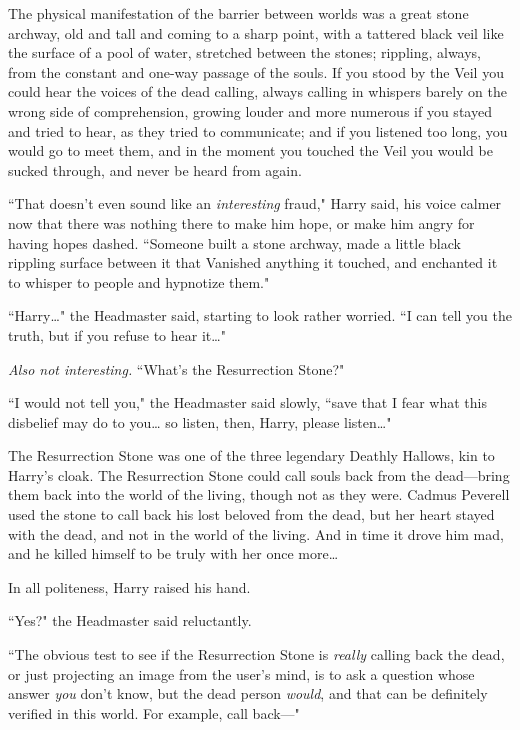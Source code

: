 The physical manifestation of the barrier between worlds was a great stone archway, old and tall and coming to a sharp point, with a tattered black veil like the surface of a pool of water, stretched between the stones; rippling, always, from the constant and one-way passage of the souls. If you stood by the Veil you could hear the voices of the dead calling, always calling in whispers barely on the wrong side of comprehension, growing louder and more numerous if you stayed and tried to hear, as they tried to communicate; and if you listened too long, you would go to meet them, and in the moment you touched the Veil you would be sucked through, and never be heard from again.

``That doesn't even sound like an \emph{interesting} fraud," Harry said, his voice calmer now that there was nothing there to make him hope, or make him angry for having hopes dashed. ``Someone built a stone archway, made a little black rippling surface between it that Vanished anything it touched, and enchanted it to whisper to people and hypnotize them."

``Harry{\ldots}" the Headmaster said, starting to look rather worried. ``I can tell you the truth, but if you refuse to hear it{\ldots}"

\emph{Also not interesting.} ``What's the Resurrection Stone?"

``I would not tell you," the Headmaster said slowly, ``save that I fear what this disbelief may do to you{\ldots} so listen, then, Harry, please listen{\ldots}"

The Resurrection Stone was one of the three legendary Deathly Hallows, kin to Harry's cloak. The Resurrection Stone could call souls back from the dead—bring them back into the world of the living, though not as they were. Cadmus Peverell used the stone to call back his lost beloved from the dead, but her heart stayed with the dead, and not in the world of the living. And in time it drove him mad, and he killed himself to be truly with her once more{\ldots}

In all politeness, Harry raised his hand.

``Yes?" the Headmaster said reluctantly.

``The obvious test to see if the Resurrection Stone is \emph{really} calling back the dead, or just projecting an image from the user's mind, is to ask a question whose answer \emph{you} don't know, but the dead person \emph{would}, and that can be definitely verified in this world. For example, call back—"

